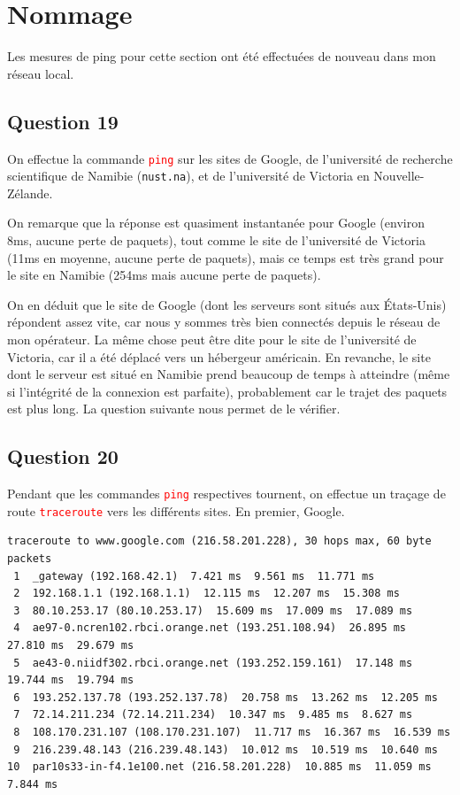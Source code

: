 \documentclass[a4paper,10pt]{article}
\newcommand{\blackword}[1]{\texttt{#1}}
\newcommand{\redword}[1]{\texttt{\textcolor{red}{#1}}}
\begin{document}
\pagebreak
\section{Nommage}

Les mesures de ping pour cette section ont été effectuées de nouveau dans mon réseau local.

\subsection{Question 19}

On effectue la commande \redword{ping} sur les sites de Google, de l'université de recherche scientifique de Namibie (\blackword{nust.na}), et de l'université de Victoria en Nouvelle-Zélande.

On remarque que la réponse est quasiment instantanée pour Google (environ 8ms, aucune perte de paquets), tout comme le site de l'université de Victoria (11ms en moyenne, aucune perte de paquets), mais ce temps est très grand pour le site en Namibie (254ms mais aucune perte de paquets).

On en déduit que le site de Google (dont les serveurs sont situés aux États-Unis) répondent assez vite, car nous y sommes très bien connectés depuis le réseau de mon opérateur. La même chose peut être dite pour le site de l'université de Victoria, car il a été déplacé vers un hébergeur américain. En revanche, le site dont le serveur est situé en Namibie prend beaucoup de temps à atteindre (même si l'intégrité de la connexion est parfaite), probablement car le trajet des paquets est plus long. La question suivante nous permet de le vérifier.

\subsection{Question 20} Pendant que les commandes \redword{ping} respectives tournent, on effectue un traçage de route \redword{traceroute} vers les différents sites. En premier, Google.

\begin{lstlisting}[basicstyle=\tiny]
traceroute to www.google.com (216.58.201.228), 30 hops max, 60 byte packets
 1  _gateway (192.168.42.1)  7.421 ms  9.561 ms  11.771 ms
 2  192.168.1.1 (192.168.1.1)  12.115 ms  12.207 ms  15.308 ms
 3  80.10.253.17 (80.10.253.17)  15.609 ms  17.009 ms  17.089 ms
 4  ae97-0.ncren102.rbci.orange.net (193.251.108.94)  26.895 ms  27.810 ms  29.679 ms
 5  ae43-0.niidf302.rbci.orange.net (193.252.159.161)  17.148 ms  19.744 ms  19.794 ms
 6  193.252.137.78 (193.252.137.78)  20.758 ms  13.262 ms  12.205 ms
 7  72.14.211.234 (72.14.211.234)  10.347 ms  9.485 ms  8.627 ms
 8  108.170.231.107 (108.170.231.107)  11.717 ms  16.367 ms  16.539 ms
 9  216.239.48.143 (216.239.48.143)  10.012 ms  10.519 ms  10.640 ms
10  par10s33-in-f4.1e100.net (216.58.201.228)  10.885 ms  11.059 ms  7.844 ms
\end{lstlisting}
\end{document}

